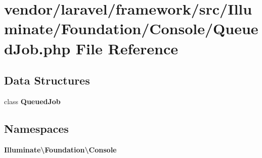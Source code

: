 \section{vendor/laravel/framework/src/\+Illuminate/\+Foundation/\+Console/\+Queued\+Job.php File Reference}
\label{_queued_job_8php}
\subsection*{Data Structures}
\begin{DoxyCompactItemize}
\item 
class {\bf Queued\+Job}
\end{DoxyCompactItemize}
\subsection*{Namespaces}
\begin{DoxyCompactItemize}
\item 
 {\bf Illuminate\textbackslash{}\+Foundation\textbackslash{}\+Console}
\end{DoxyCompactItemize}
